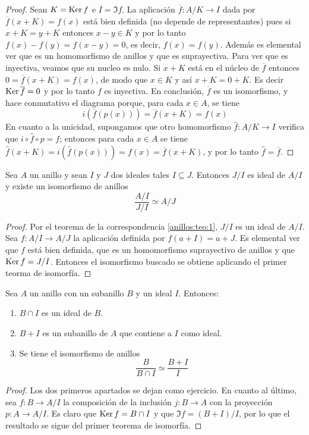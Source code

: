 \begin{proof}
    Sean $K=\operatorname{\rm Ker} f$ e $I=\Im f$. La aplicación $\overline{f}: A/K\rightarrow I$ dada por $\overline{f}(x+K)=f(x)$ está bien definida (no depende de representantes) pues si $x+K=y+K$ entonces $x-y\in K$ y por lo tanto $f(x)-f(y)=f(x-y)=0$, es decir, $f(x)=f(y)$. Además es elemental ver que es un homomorfismo de anillos y que es suprayectiva. Para ver que es inyectiva, veamos que su nucleo es nulo. Si $x+K$ está en el núcleo de $\overline{f}$ entonces $0=\overline{f}(x+K)=f(x)$, de modo que $x\in K$ y así $x+K=0+K$. Es decir $\operatorname{\rm Ker}\overline{f}=0$ y por lo tanto $f$ es inyectiva. En conclusión, $\overline{f}$ es un isomorfismo, y hace conmutativo el diagrama porque, para cada $x\in A$, se tiene
    $$i\left(\overline{f}\left(p(x)\right)\right)=\overline{f}(x+K)=f(x)$$
    En cuanto a la unicidad, supongamos que otro homomorfismo $\widehat{f}:A/K\longrightarrow I$ verifica que $i\circ \widehat{f} \circ p=f$; entonces para cada $x\in A$ se tiene $\widehat{f}(x+K)=i(\widehat{f}(p(x)))=f(x)=\overline{f}(x+K)$, y por lo tanto $\widehat{f}=\overline{f}$.
\end{proof}

\begin{teo} Sea $A$ un anillo y sean $I$ y $J$ dos ideales tales $I\subseteq J$.
    Entonces $J/I$ es ideal de $A/I$ y existe un isomorfismo de anillos
    $$\frac{A/I}{J/I}\simeq A/J$$
\end{teo}

\begin{proof}
    Por el teorema de la correspondencia \ref{anillos:teo:1}, $J/I$ es un ideal de $A/I$. Sea $f:A/I\rightarrow A/J$ la aplicación definida por $f(a+I)=a+J$. Es elemental ver que $f$ está bien definida, que es un homomorfismo suprayectivo de anillos y que $\operatorname{\rm Ker} f = J/I$. Entonces el isomorfismo buscado se obtiene aplicando el primer teorma de isomorfía.
\end{proof}

\begin{teo} Sea $A$ un anillo con un subanillo $B$ y un ideal $I$. Entonces:
    \begin{enumerate}[label=(\arabic*)]
        \item $B\cap I$ es un ideal de $B$.
        \item $B+I$ es un subanillo de $A$ que contiene a $I$ como ideal.
        \item Se tiene el isomorfismo de anillos
        $$\frac{B}{B\cap I}\simeq \frac{B+I}{I}$$
    \end{enumerate}    
\end{teo}

\begin{proof}
    Los dos primeros apartados se dejan como ejercicio. En cuanto al último, sea $f:B\rightarrow A/I$ la composición de la inclusión $j:B\rightarrow A$ con la proyección $p:A\rightarrow A/I$. Es claro que $\operatorname{\rm Ker} f=B\cap I$ y que $\Im f=(B+I)/I$, por lo que el resultado se sigue del primer teorema de isomorfía.
\end{proof}